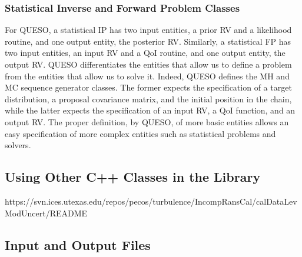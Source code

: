 \subsubsection{Statistical Inverse and Forward Problem Classes}
%
For QUESO, a statistical IP has two input entities, a prior RV and a likelihood routine, and one output entity, the posterior RV.
Similarly, a statistical FP has two input entities, an input RV and a QoI routine, and one output entity, the output RV.
QUESO differentiates the entities that allow us to define a problem from the entities that allow us to solve it.
Indeed, QUESO defines the MH and MC sequence generator classes.
The former expects the specification of a target distribution, a proposal covariance matrix, and the initial position in the chain,
while the latter expects the specification of an input RV, a QoI function, and an output RV.
The proper definition, by QUESO, of more basic entities allows an easy specification of more complex entities such as statistical problems and solvers.

% 


\subsection{Using Other C++ Classes in the Library}

https://svn.ices.utexas.edu/repos/pecos/turbulence/IncompRansCal/calDataLevModUncert/README
\subsection{Input and Output Files}

